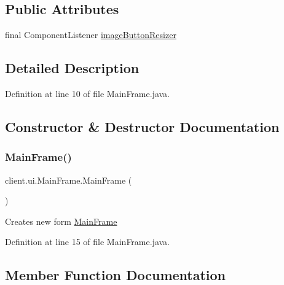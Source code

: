\subsection*{Public Attributes}
\begin{DoxyCompactItemize}
\item 
final Component\+Listener \hyperlink{classclient_1_1ui_1_1_main_frame_adc5b4f5b4aa376358a04eddef4741233}{image\+Button\+Resizer}
\end{DoxyCompactItemize}


\subsection{Detailed Description}


Definition at line 10 of file Main\+Frame.\+java.



\subsection{Constructor \& Destructor Documentation}
\hypertarget{classclient_1_1ui_1_1_main_frame_ac3662d47eb66c2009f7fc3d0e274a703}{}\label{classclient_1_1ui_1_1_main_frame_ac3662d47eb66c2009f7fc3d0e274a703} 
\subsubsection{\texorpdfstring{Main\+Frame()}{MainFrame()}}
{\footnotesize\ttfamily client.\+ui.\+Main\+Frame.\+Main\+Frame (\begin{DoxyParamCaption}{ }\end{DoxyParamCaption})}

Creates new form \hyperlink{classclient_1_1ui_1_1_main_frame}{Main\+Frame} 

Definition at line 15 of file Main\+Frame.\+java.



\subsection{Member Function Documentation}
\hypertarget{classclient_1_1ui_1_1_main_frame_ae415687be6f7197dd0d70d65d08d5221}{}\label{classclient_1_1ui_1_1_main_frame_ae415687be6f7197dd0d70d65d08d5221} 

